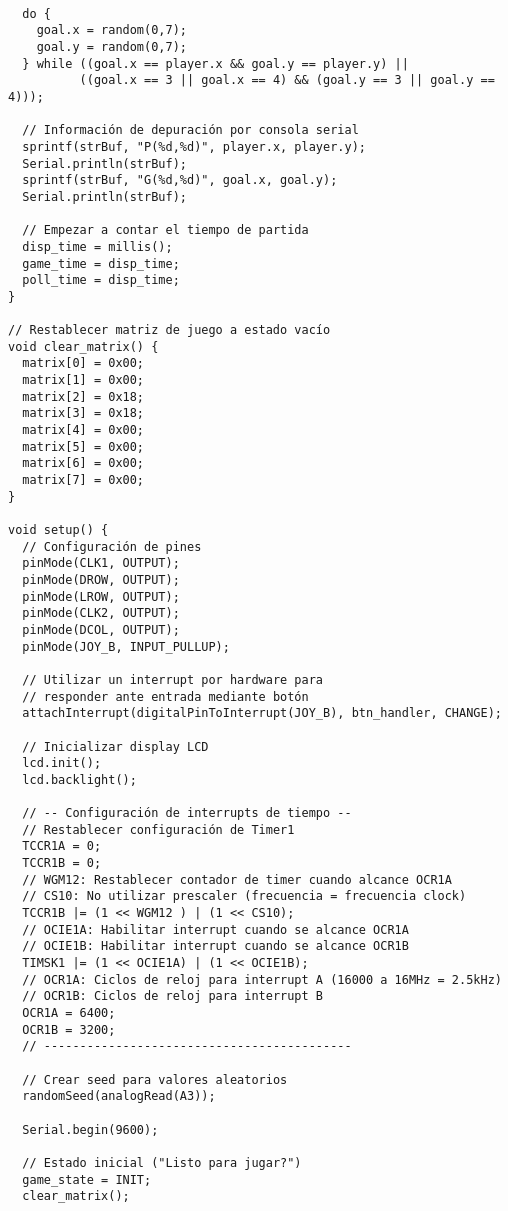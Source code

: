\begin{listing}[H]
     \scriptsize
  \begin{verbatim}

  do {
    goal.x = random(0,7);
    goal.y = random(0,7);
  } while ((goal.x == player.x && goal.y == player.y) ||
          ((goal.x == 3 || goal.x == 4) && (goal.y == 3 || goal.y == 4)));

  // Información de depuración por consola serial
  sprintf(strBuf, "P(%d,%d)", player.x, player.y);
  Serial.println(strBuf);
  sprintf(strBuf, "G(%d,%d)", goal.x, goal.y);
  Serial.println(strBuf);

  // Empezar a contar el tiempo de partida
  disp_time = millis();
  game_time = disp_time;
  poll_time = disp_time;
}

// Restablecer matriz de juego a estado vacío
void clear_matrix() {
  matrix[0] = 0x00;
  matrix[1] = 0x00;
  matrix[2] = 0x18;
  matrix[3] = 0x18;
  matrix[4] = 0x00;
  matrix[5] = 0x00;
  matrix[6] = 0x00;
  matrix[7] = 0x00;
}

void setup() {
  // Configuración de pines
  pinMode(CLK1, OUTPUT);
  pinMode(DROW, OUTPUT);
  pinMode(LROW, OUTPUT);
  pinMode(CLK2, OUTPUT);
  pinMode(DCOL, OUTPUT);
  pinMode(JOY_B, INPUT_PULLUP);

  // Utilizar un interrupt por hardware para
  // responder ante entrada mediante botón
  attachInterrupt(digitalPinToInterrupt(JOY_B), btn_handler, CHANGE);

  // Inicializar display LCD
  lcd.init();
  lcd.backlight();

  // -- Configuración de interrupts de tiempo --
  // Restablecer configuración de Timer1
  TCCR1A = 0;
  TCCR1B = 0;
  // WGM12: Restablecer contador de timer cuando alcance OCR1A
  // CS10: No utilizar prescaler (frecuencia = frecuencia clock)
  TCCR1B |= (1 << WGM12 ) | (1 << CS10);
  // OCIE1A: Habilitar interrupt cuando se alcance OCR1A
  // OCIE1B: Habilitar interrupt cuando se alcance OCR1B
  TIMSK1 |= (1 << OCIE1A) | (1 << OCIE1B);
  // OCR1A: Ciclos de reloj para interrupt A (16000 a 16MHz = 2.5kHz)
  // OCR1B: Ciclos de reloj para interrupt B
  OCR1A = 6400;
  OCR1B = 3200;
  // -------------------------------------------

  // Crear seed para valores aleatorios
  randomSeed(analogRead(A3));

  Serial.begin(9600);

  // Estado inicial ("Listo para jugar?")
  game_state = INIT;
  clear_matrix();
\end{verbatim}
\end{listing}
